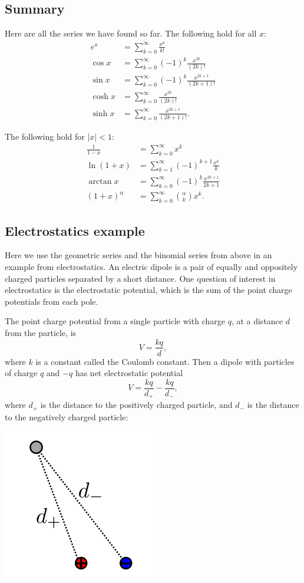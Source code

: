 \documentclass[twoside,openright,titlepage,a4paper]{book}
\begin{document}
\begin{sloppypar}
\subsection{Summary}

Here are all the series we have found so far. The following hold for all $x$:
\begin{align*} 
e^x &= \sum_{k=0}^\infty \frac{x^k}{k!} \\
\cos x &= \sum_{k=0}^\infty (-1)^k \frac{x^{2k}}{(2k)!} \\
\sin x &= \sum_{k=0}^\infty (-1)^k \frac{x^{2k+1}}{(2k+1)!} \\
\cosh x &= \sum_{k=0}^\infty \frac{x^{2k}}{(2k)!} \\
\sinh x &= \sum_{k=0}^\infty \frac{x^{2k+1}}{(2k+1)!}. 
\end{align*}

The following hold for $|x|<1$:
\begin{align*}
\frac{1}{1-x} &= \sum_{k=0}^\infty x^k \\
\ln(1+x) &= \sum_{k=1}^\infty (-1)^{k+1} \frac{x^k}{k} \\
\arctan x &= \sum_{k=0}^\infty (-1)^k \frac{x^{2k+1}}{2k+1} \\
(1+x)^\alpha &= \sum_{k=0}^\infty \binom{\alpha}{k} x^k. 
\end{align*}

\subsection{Electrostatics example}

Here we use the geometric series and the binomial series from above in an example from electrostatics. An electric dipole is a pair of equally and oppositely charged particles separated by a short distance. One question of interest in electrostatics is the electrostatic potential, which is the sum of the point charge potentials from each pole.

The point charge potential from a single particle with charge $q$, at a distance $d$ from the particle, is \[ V = \frac{kq}{d}, \] where $k$ is a constant called the Coulomb constant. Then a dipole with particles of charge $q$ and $-q$ has net electrostatic potential \[ V = \frac{kq}{d_+} - \frac{kq}{d_-}, \] where $d_+$ is the distance to the positively charged particle, and $d_-$ is the distance to the negatively charged particle:
\begin{center}\includegraphics[scale=0.6]{Dipole}\end{center}


\end{sloppypar}
\end{document}
